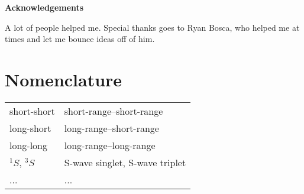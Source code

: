 \documentclass[12pt,openany]{book}
\def\biblio{}
\begin{document}
\def\biblio{}



{} %





\clearpage
\thispagestyle{plain}
\begin{center}
    \large
    \textbf{Acknowledgements}
\end{center}
A lot of people helped me. Special thanks goes to Ryan Bosca, who helped me at times and let me bounce ideas off of him.


\hypersetup{linktocpage}
\hypersetup{
    colorlinks,
    citecolor=black,
    filecolor=black,
    linkcolor=black,
    urlcolor=black
}

\tableofcontents
\newpage
\listoffigures
\listoftables
\newpage
{}


\clearpage
\chapter*{Nomenclature}
\label{chp:nomenclature}
\begin{table*}
	\begin{tabular}{l l}
short-short & short-range--short-range \\
long-short & long-range--short-range \\
long-long & long-range--long-range \\
$^1S$, $^3S$ & S-wave singlet, S-wave triplet  \\
... & ...                \\
	\end{tabular}
\end{table*}
\end{document}

